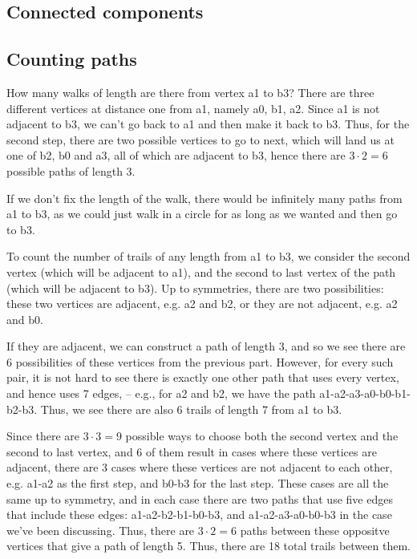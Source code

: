 \documentclass{amsart}
\begin{document}
\subsection{Connected components}


\subsection{Counting paths}

How many walks of length are there from vertex a1 to b3?  There are three different vertices at distance one from a1, namely a0, b1, a2.  Since a1 is not adjacent to b3, we can't go back to a1 and then make it back to b3.  Thus, for the second step, there are two possible vertices to go to next, which will land us at one of b2, b0 and a3, all of which are adjacent to b3, hence there are $3\cdot 2=6$ possible paths of length 3.

If we don't fix the length of the walk, there would be infinitely many paths from a1 to b3, as we could just walk in a circle for as long as we wanted and then go to b3.

To count the number of trails of any length from a1 to b3, we consider the second vertex (which will be adjacent to a1), and the second to last vertex of the path (which will be adjacent to b3).  Up to symmetries, there are two possibilities: these two vertices are adjacent, e.g. a2 and b2, or they are not adjacent, e.g. a2 and b0.

If they are adjacent, we can construct a path of length 3, and so we see there are 6 possibilities of these vertices from the previous part.  However, for every such pair, it is not hard to see there is exactly one other path that uses every vertex, and hence uses 7 edges, -- e.g., for a2 and b2, we have the path a1-a2-a3-a0-b0-b1-b2-b3.  Thus, we see there are also 6 trails of length 7 from a1 to b3. 

Since there are $3\cdot 3=9$ possible ways to choose both the second vertex and the second to last vertex, and $6$ of them result in cases where these vertices are adjacent, there are $3$ cases where these vertices are not adjacent to each other, e.g. a1-a2 as the first step, and b0-b3 for the last step.  These cases are all the same up to symmetry, and in each case there are two paths that use five edges that include these edges: a1-a2-b2-b1-b0-b3, and a1-a2-a3-a0-b0-b3 in the case we've been discussing.  Thus, there are $3\cdot 2=6$ paths between these oppositve vertices that give a path of length 5.  Thus, there are 18 total trails between them.
\end{document}
